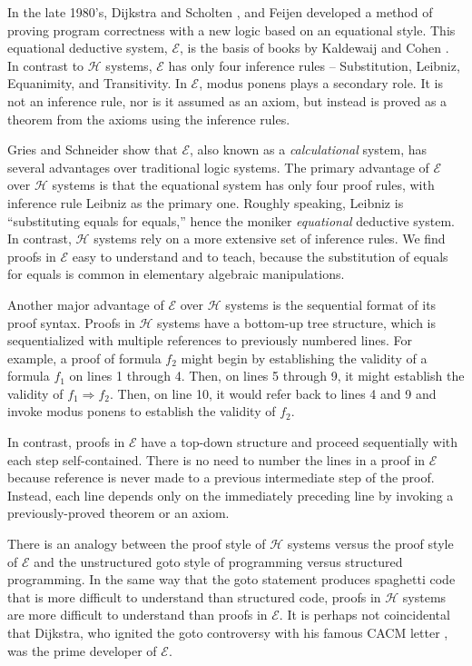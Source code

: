 \documentclass[12pt, fleqn, leqno]{article}
\newcommand{\impl}{\ensuremath{\Rightarrow}}        %
\begin{document}
In the late 1980's, Dijkstra and Scholten \cite{DandS}, and Feijen \cite{Feij} developed a method of proving program correctness with a new logic based on an equational style.
This equational deductive system, $\mathcal{E}$, is the basis of books by Kaldewaij \cite{Kald} and Cohen \cite{Cohen}.
In contrast to $\mathcal{H}$ systems, $\mathcal{E}$ has only four inference rules -- Substitution, Leibniz, Equanimity, and Transitivity.
In $\mathcal{E}$, modus ponens plays a secondary role.
It is not an inference rule, nor is it assumed as an axiom, but instead is proved as a theorem from the axioms using the inference rules.

Gries and Schneider \cite{Gries1995, Gries1995145} show that $\mathcal{E}$, also known as a \textit{calculational} system, has several advantages over traditional logic systems.
The primary advantage of $\mathcal{E}$ over $\mathcal{H}$ systems is that the equational system has only four proof rules, with inference rule Leibniz as the primary one.
Roughly speaking, Leibniz is ``substituting equals for equals,'' hence the moniker \textit{equational} deductive system.
In contrast, $\mathcal{H}$ systems rely on a more extensive set of inference rules.
We find proofs in $\mathcal{E}$ easy to understand and to teach, because the substitution of equals for equals is common in elementary algebraic manipulations.

Another major advantage of $\mathcal{E}$ over $\mathcal{H}$ systems is the sequential format of its proof syntax.
Proofs in $\mathcal{H}$ systems have a bottom-up tree structure, which is sequentialized with multiple references to previously numbered lines.
For example, a proof of formula $f_2$ might begin by establishing the validity  of a formula $f_1$ on lines 1 through 4.
Then, on lines 5 through 9, it might establish the validity of $f_1\impl f_2$.
Then, on line 10, it would refer back to lines 4 and 9 and invoke modus ponens to establish the validity of $f_2$.

In contrast, proofs in $\mathcal{E}$ have a top-down structure and proceed sequentially with each step self-contained.
There is no need to number the lines in a proof in $\mathcal{E}$ because reference is never made to a previous intermediate step of the proof.
Instead, each line depends only on the immediately preceding line by invoking a previously-proved theorem or an axiom.

There is an analogy between the proof style of $\mathcal{H}$ systems versus the proof style of $\mathcal{E}$ and the unstructured goto style of programming versus structured programming.
In the same way that the goto statement produces spaghetti code that is more difficult to understand than structured code, proofs in $\mathcal{H}$ systems are more difficult to understand than proofs in $\mathcal{E}$.
It is perhaps not coincidental that Dijkstra, who ignited the goto controversy with his famous CACM letter \cite{Dijkstra:1968:LEG:362929.362947}, was the prime developer of $\mathcal{E}$.
\end{document}
